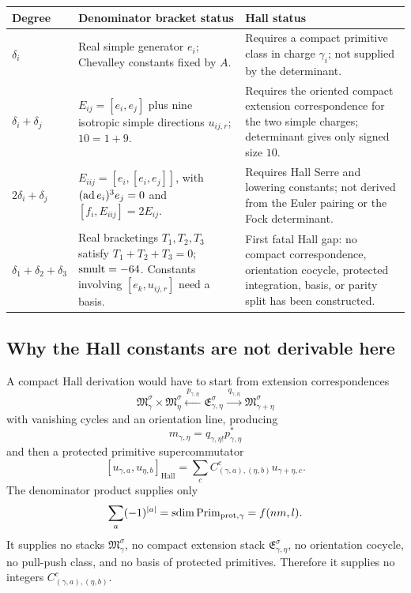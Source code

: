 \begin{center}
\begingroup
\small
\begin{tabular}{p{}|p{}|p{}}
\textbf{Degree} & \textbf{Denominator bracket status} & \textbf{Hall status}\\
\hline
\(\delta_i\) &
Real simple generator \(e_i\); Chevalley constants fixed by \(A\). &
Requires a compact primitive class in charge \(\gamma_i\); not supplied by the determinant.\\
\hline
\(\delta_i+\delta_j\) &
\(E_{ij}=[e_i,e_j]\) plus nine isotropic simple directions
\(u_{ij,r}\); \(10=1+9\). &
Requires the oriented compact extension correspondence for the two
simple charges; determinant gives only signed size \(10\).\\
\hline
\(2\delta_i+\delta_j\) &
\(E_{iij}=[e_i,[e_i,e_j]]\), with
\((\operatorname{ad} e_i)^3e_j=0\) and
\([f_i,E_{iij}]=2E_{ij}\). &
Requires Hall Serre and lowering constants; not derived from the Euler
pairing or the Fock determinant.\\
\hline
\(\delta_1+\delta_2+\delta_3\) &
Real bracketings \(T_1,T_2,T_3\) satisfy \(T_1+T_2+T_3=0\);
\(\operatorname{smult}=-64\).  Constants involving \([e_k,u_{ij,r}]\) need a basis. &
First fatal Hall gap: no compact correspondence, orientation cocycle,
protected integration, basis, or parity split has been constructed.
\end{tabular}
\endgroup
\end{center}

\subsection{Why the Hall constants are not derivable here}

A compact Hall derivation would have to start from extension
correspondences
$$
\mathfrak M_\gamma^\sigma\times\mathfrak M_\eta^\sigma
\xleftarrow{\ p_{\gamma,\eta}\ }
\mathfrak E_{\gamma,\eta}^\sigma
\xrightarrow{\ q_{\gamma,\eta}\ }
\mathfrak M_{\gamma+\eta}^\sigma
$$
with vanishing cycles and an orientation line, producing
$$
m_{\gamma,\eta}
=q_{\gamma,\eta!}p_{\gamma,\eta}^{*}
$$
and then a protected primitive supercommutator
$$
[u_{\gamma,a},u_{\eta,b}]_{\mathrm{Hall}}
=
\sum_c C^c_{(\gamma,a),(\eta,b)}u_{\gamma+\eta,c}.
$$
The denominator product supplies only
$$
\sum_a(-1)^{|a|}
=\operatorname{sdim}\operatorname{Prim}_{\mathrm{prot},\gamma}
=f(nm,l).
$$
It supplies no stacks \(\mathfrak M_\gamma^\sigma\), no compact
extension stack \(\mathfrak E_{\gamma,\eta}^\sigma\), no orientation
cocycle, no pull-push class, and no basis of protected primitives.
Therefore it supplies no integers
\(C^c_{(\gamma,a),(\eta,b)}\).

